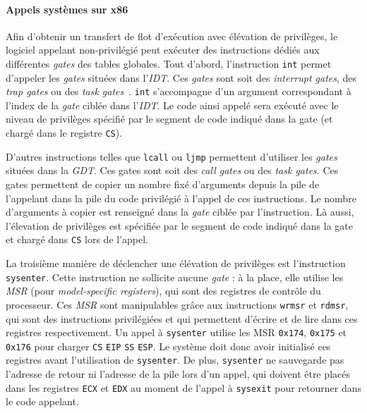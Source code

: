\paragraph{Appels systèmes sur x86}

Afin d'obtenir un transfert de flot d'exécution avec élévation de privilèges, le logiciel appelant non-privilégié peut exécuter des instructions dédiés aux différentes \emph{gates} des tables globales. Tout d'abord, l'instruction \texttt{int} permet d'appeler les \emph{gates} situées dans l'\emph{IDT}. Ces \emph{gates} sont soit des \emph{interrupt gates}, des \emph{trap gates} ou des \emph{task gates}~\cite{intel_idt_gates}. \texttt{int} s'accompagne d'un argument correspondant à l'index de la \emph{gate} ciblée dans l'\emph{IDT}. Le code ainsi appelé sera exécuté avec le niveau de privilèges spécifié par le segment de code indiqué dans la gate (et chargé dans le registre \texttt{CS}).

\label{sec:x86_syscall}
D'autres instructions telles que \texttt{lcall} ou \texttt{ljmp} permettent d'utiliser les \emph{gates} situées dans la \emph{GDT}. Ces gates sont soit des \emph{call gates} ou des \emph{task gates}. Ces gates permettent de copier un nombre fixé d'arguments depuis la pile de l'appelant dans la pile du code privilégié à l'appel de ces instructions. Le nombre d'arguments à copier est renseigné dans la \emph{gate} ciblée par l'instruction. Là aussi, l'élevation de privilèges est spécifiée par le segment de code indiqué dans la gate et chargé dans \texttt{CS} lors de l'appel.

La troisième manière de déclencher une élévation de privilèges est l'instruction \texttt{sysenter}. Cette 
instruction ne sollicite aucune \emph{gate} : à la place, elle utilise les \emph{MSR} (pour \emph{model-specific registers}), qui sont des registres de contrôle du processeur. Ces \emph{MSR} sont manipulables grâce aux instructions \texttt{wrmsr} et \texttt{rdmsr}, qui sont des instructions privilégiées et qui permettent d'écrire et de lire dans ces registres respectivement. Un appel à \texttt{sysenter} utilise les MSR \texttt{0x174}, \texttt{0x175} et \texttt{0x176} pour charger \texttt{CS} \texttt{EIP} \texttt{SS} \texttt{ESP}. Le système doit donc avoir initialisé ces registres avant l'utilisation de \texttt{sysenter}. De plus, \texttt{sysenter} ne sauvegarde pas l'adresse de retour ni l'adresse de la pile lors d'un appel, qui doivent être placés dans les registres \texttt{ECX} et \texttt{EDX} au moment de l'appel à \texttt{sysexit} pour retourner dans le code appelant.

